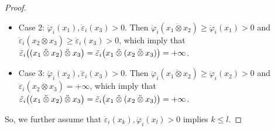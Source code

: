 \documentclass[a4paper,reqno]{amsart}
\numberwithin{equation}{section}
\theoremstyle{plain}
\theoremstyle{definition}
\theoremstyle{remark}
\DeclarePairedDelimiter{\parens}{\lparen}{\rparen}
\newcommand*{\qKoec}{\ddot{\varepsilon}}
\newcommand*{\qKofc}{\ddot{\varphi}}
\newcommand*{\dotimes}{\mathbin{\ddot{\otimes}}}  %
\begin{document}
\begin{proof}
\begin{itemize}
\item Case 2: $\qKofc_i (x_1), \qKoec_i (x_3) > 0$.
Then $\qKofc_i (x_1 \dotimes x_2) \geq \qKofc_i (x_1) > 0$ and $\qKoec_i (x_2 \dotimes x_3) \geq \qKoec_i (x_3) > 0$, which imply that
$\qKoec_i \parens[\big]{(x_1 \dotimes x_2) \dotimes x_3} = \qKoec_i \parens[\big]{x_1 \dotimes (x_2 \dotimes x_3)} = +\infty$.

\item Case 3: $\qKofc_i (x_2), \qKoec_i (x_3) > 0$.
Then $\qKofc_i (x_1 \dotimes x_2) \geq \qKofc_i (x_2) > 0$ and $\qKoec_i (x_2 \dotimes x_3) = +\infty$, which imply that
$\qKoec_i \parens[\big]{(x_1 \dotimes x_2) \dotimes x_3} = \qKoec_i \parens[\big]{x_1 \dotimes (x_2 \dotimes x_3)} = +\infty$.
\end{itemize}
So, we further assume that $\qKoec_i (x_k), \qKofc_i (x_l) > 0$ implies $k \leq l$.


\end{proof}
\end{document}
